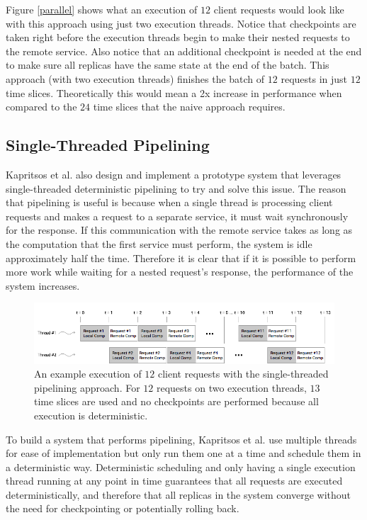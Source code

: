 \documentclass[11pt, oneside]{report}
\begin{document}
Figure \ref{parallel} shows what an execution of $12$ client requests would look like with this approach using just two execution threads. 
Notice that checkpoints are taken right before the execution threads begin to make their nested requests to the remote service. 
Also notice that an additional checkpoint is needed at the end to make sure all replicas have the same state at the end of the batch.
This approach (with two execution threads) finishes the batch of $12$ requests in just $12$ time slices.
Theoretically this would mean a 2x increase in performance when compared to the $24$ time slices that the naive approach requires.

\subsection{Single-Threaded Pipelining}\label{STP}

Kapritsos et al. also design and implement a prototype system that leverages single-threaded deterministic pipelining to try and solve this issue. 
The reason that pipelining is useful is because when a single thread is processing client requests and makes a request to a separate service, it must wait synchronously for the response. 
If this communication with the remote service takes as long as the computation that the first service must perform, the system is idle approximately half the time.
Therefore it is clear that if it is possible to perform more work while waiting for a nested request's response, the performance of the system increases.

\begin{figure}[h]
\centering
\includegraphics[width=1.0\textwidth]{SequentialPipelined.png}
\caption{\label{seqpipe}An example execution of $12$ client requests with the single-threaded pipelining approach. For $12$ requests on two execution threads, $13$ time slices are used and no checkpoints are performed because all execution is deterministic.}
\end{figure}

To build a system that performs pipelining, Kapritsos et al. use multiple threads for ease of implementation but only run them one at a time and schedule them in a deterministic way. 
Deterministic scheduling and only having a single execution thread running at any point in time guarantees that all requests are executed deterministically, and therefore that all replicas in the system converge without the need for checkpointing or potentially rolling back.
\end{document}
